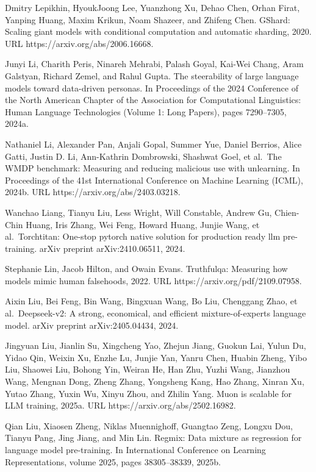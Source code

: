 Dmitry Lepikhin, HyoukJoong Lee, Yuanzhong Xu, Dehao Chen, Orhan Firat,
Yanping Huang, Maxim Krikun, Noam Shazeer, and Zhifeng Chen. GShard:
Scaling giant models with conditional computation and automatic
sharding, 2020. URL https://arxiv.org/abs/2006.16668.

Junyi Li, Charith Peris, Ninareh Mehrabi, Palash Goyal, Kai-Wei Chang,
Aram Galstyan, Richard Zemel, and Rahul Gupta. The steerability of large
language models toward data-driven personas. In Proceedings of the 2024
Conference of the North American Chapter of the Association for
Computational Linguistics: Human Language Technologies (Volume 1: Long
Papers), pages 7290--7305, 2024a.

Nathaniel Li, Alexander Pan, Anjali Gopal, Summer Yue, Daniel Berrios,
Alice Gatti, Justin D. Li, Ann-Kathrin Dombrowski, Shashwat Goel, et
al.~The WMDP benchmark: Measuring and reducing malicious use with
unlearning. In Proceedings of the 41st International Conference on Machine
Learning (ICML), 2024b. URL https://arxiv.org/abs/2403.03218.

Wanchao Liang, Tianyu Liu, Less Wright, Will Constable, Andrew Gu,
Chien-Chin Huang, Iris Zhang, Wei Feng, Howard Huang, Junjie Wang, et
al.~Torchtitan: One-stop pytorch native solution for production ready
llm pre-training. arXiv preprint arXiv:2410.06511, 2024.

Stephanie Lin, Jacob Hilton, and Owain Evans. Truthfulqa: Measuring how
models mimic human falsehoods, 2022. URL
https://arxiv.org/pdf/2109.07958.



Aixin Liu, Bei Feng, Bin Wang, Bingxuan Wang, Bo Liu, Chenggang Zhao, et
al.~Deepseek-v2: A strong, economical, and efficient mixture-of-experts
language model. arXiv preprint arXiv:2405.04434, 2024.

Jingyuan Liu, Jianlin Su, Xingcheng Yao, Zhejun Jiang, Guokun Lai, Yulun
Du, Yidao Qin, Weixin Xu, Enzhe Lu, Junjie Yan, Yanru Chen, Huabin
Zheng, Yibo Liu, Shaowei Liu, Bohong Yin, Weiran He, Han Zhu, Yuzhi
Wang, Jianzhou Wang, Mengnan Dong, Zheng Zhang, Yongsheng Kang, Hao
Zhang, Xinran Xu, Yutao Zhang, Yuxin Wu, Xinyu Zhou, and Zhilin Yang.
Muon is scalable for LLM training, 2025a. URL
https://arxiv.org/abs/2502.16982.

Qian Liu, Xiaosen Zheng, Niklas Muennighoff, Guangtao Zeng, Longxu Dou,
Tianyu Pang, Jing Jiang, and Min Lin. Regmix: Data mixture as regression
for language model pre-training. In International Conference on Learning
Representations, volume 2025, pages 38305--38339, 2025b.

